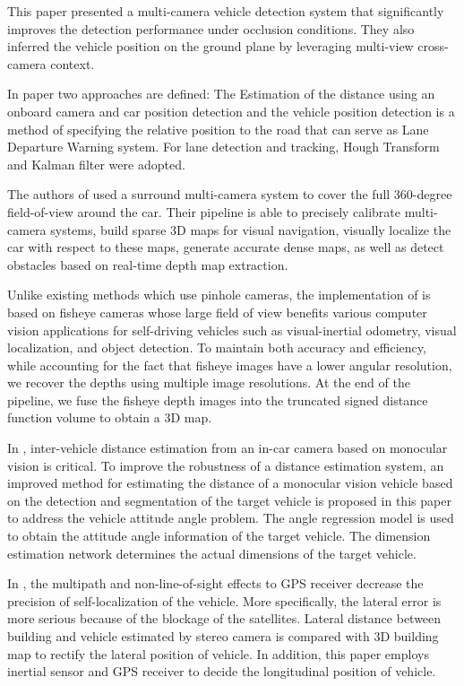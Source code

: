 This paper \cite{Wu2019} presented a multi-camera vehicle detection system that significantly improves the detection performance under occlusion conditions. They also inferred the vehicle position on the ground plane by leveraging multi-view cross-camera context.

In paper \cite{Ali2016} two approaches are defined: The  Estimation of the distance using an onboard camera and car position detection and the vehicle position detection is a method of specifying the relative position to the road that can serve as Lane Departure Warning system. For lane detection and tracking, Hough Transform and Kalman filter were adopted.


The authors of \cite{Hane2017} used a surround multi-camera system to cover the full 360-degree field-of-view around the car. Their pipeline is able to precisely calibrate multi-camera systems, build sparse 3D maps for visual navigation, visually localize the car with respect to these maps, generate accurate dense maps, as well as detect obstacles based on real-time depth map extraction.

Unlike existing methods which use pinhole cameras, the implementation of \cite{Cui2019} is based on fisheye cameras whose large field of view benefits various computer vision applications for self-driving vehicles such as visual-inertial odometry, visual localization, and object detection. To maintain both accuracy and efficiency, while accounting for the fact that fisheye images have a lower angular resolution, we recover the depths using multiple image resolutions. At the end of the pipeline, we fuse the fisheye depth images into the truncated signed distance function volume to obtain a 3D map.

In \cite{Huang2019}, inter-vehicle distance estimation from an in-car camera based on monocular vision is critical. To improve the robustness of a distance estimation system, an improved method for estimating the distance of a monocular vision vehicle based on the detection and segmentation of the target vehicle is proposed in this paper to address the vehicle attitude angle problem. The angle regression model is used to obtain the attitude angle information of the target vehicle. The dimension estimation network determines the actual dimensions of the target vehicle.

In \cite{Bao2016}, the multipath and non-line-of-sight effects to GPS receiver decrease the precision of self-localization of the vehicle. More specifically, the lateral error is more serious because of the blockage of the satellites. Lateral distance between building and vehicle estimated by stereo camera is compared with 3D building map to rectify the lateral position of vehicle. In addition, this paper employs inertial sensor and GPS receiver to decide the longitudinal position of vehicle.

